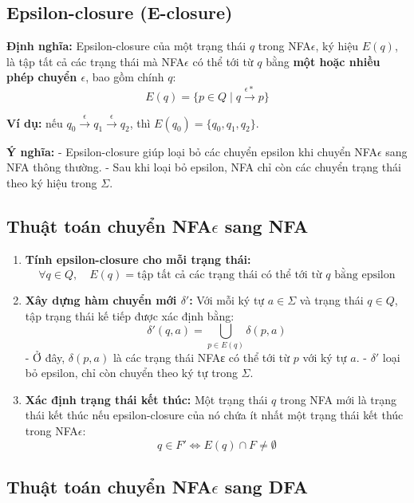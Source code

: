 \documentclass[12pt,a4paper]{report}
\begin{document}
\subsection{Epsilon-closure (E-closure)}

\textbf{Định nghĩa:}  
Epsilon-closure của một trạng thái $q$ trong NFA$\epsilon$, ký hiệu $E(q)$, là tập tất cả các trạng thái mà NFA$\epsilon$ có thể tới từ $q$ bằng \textbf{một hoặc nhiều phép chuyển $\epsilon$}, bao gồm chính $q$:
\[
E(q) = \{ p \in Q \mid q \xrightarrow{\epsilon*} p \}
\]

\textbf{Ví dụ:} nếu $q_0 \xrightarrow{\epsilon} q_1 \xrightarrow{\epsilon} q_2$, thì $E(q_0) = \{q_0, q_1, q_2\}$.  

\textbf{Ý nghĩa:}  
- Epsilon-closure giúp loại bỏ các chuyển epsilon khi chuyển NFA$\epsilon$ sang NFA thông thường.  
- Sau khi loại bỏ epsilon, NFA chỉ còn các chuyển trạng thái theo ký hiệu trong $\Sigma$.

\subsection{Thuật toán chuyển NFA$\epsilon$ sang NFA}

\begin{enumerate}
    \item \textbf{Tính epsilon-closure cho mỗi trạng thái:}  
    \[
        \forall q \in Q, \quad E(q) = \text{tập tất cả các trạng thái có thể tới từ $q$ bằng epsilon}
    \]
    
    \item \textbf{Xây dựng hàm chuyển mới $\delta'$:}  
    Với mỗi ký tự $a \in \Sigma$ và trạng thái $q \in Q$, tập trạng thái kế tiếp được xác định bằng:
    \[
        \delta'(q, a) = \bigcup_{p \in E(q)} \delta(p, a)
    \]
    - Ở đây, $\delta(p,a)$ là các trạng thái NFAε có thể tới từ $p$ với ký tự $a$.
    - $\delta'$ loại bỏ epsilon, chỉ còn chuyển theo ký tự trong $\Sigma$.
    
    \item \textbf{Xác định trạng thái kết thúc:}  
    Một trạng thái $q$ trong NFA mới là trạng thái kết thúc nếu epsilon-closure của nó chứa ít nhất một trạng thái kết thúc trong NFA$\epsilon$:
    \[
        q \in F' \iff E(q) \cap F \neq \emptyset
    \]
\end{enumerate}

\subsection{Thuật toán chuyển NFA$\epsilon$ sang DFA}
\end{document}
